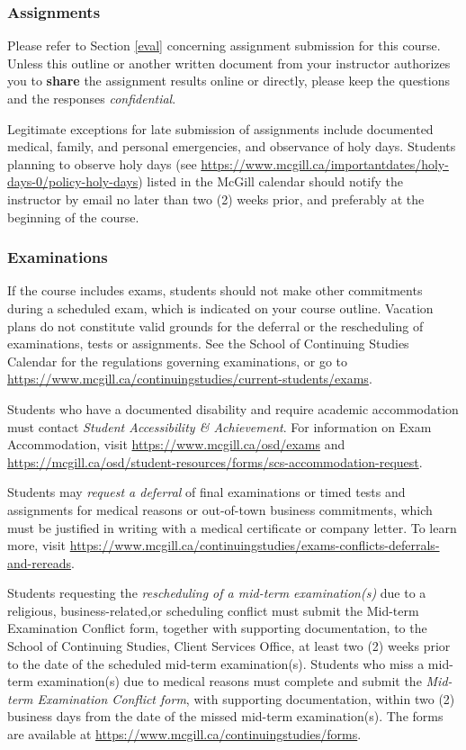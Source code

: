 \documentclass{article}
\begin{document}
\subsubsection{Assignments}

Please refer to Section \ref{eval} concerning assignment submission
for this course. Unless this outline or another written document from
your instructor authorizes you to {\bf share} the assignment results
online or directly, please keep the questions and the responses {\em
  confidential}.

Legitimate exceptions for late submission of assignments include
documented medical, family, and personal emergencies, and observance
of holy days. Students planning to observe holy days (see
\url{https://www.mcgill.ca/importantdates/holy-days-0/policy-holy-days})
listed in the McGill calendar should notify the instructor by email no
later than two (2) weeks prior, and preferably at the beginning of the
course.

\subsubsection{Examinations}

If the course includes exams, students should not make other
commitments during a scheduled exam, which is indicated on your course
outline. Vacation plans do not constitute valid grounds for the
deferral or the rescheduling of examinations, tests or
assignments. See the School of Continuing Studies Calendar for the
regulations governing examinations, or go to
\url{https://www.mcgill.ca/continuingstudies/current-students/exams}.

Students who have a documented disability and require academic
accommodation must contact {\em Student Accessibility \&
  Achievement}. For information on Exam Accommodation, visit
\url{https://www.mcgill.ca/osd/exams} and
\url{https://mcgill.ca/osd/student-resources/forms/scs-accommodation-request}.


Students may {\em request a deferral} of final examinations or timed
tests and assignments for medical reasons or out-of-town business
commitments, which must be justified in writing with a medical
certificate or company letter. To learn more, visit
\url{https://www.mcgill.ca/continuingstudies/exams-conflicts-deferrals-and-rereads}.


Students requesting the {\em rescheduling of a mid-term
  examination(s)} due to a religious, business-related,or scheduling
conflict must submit the Mid-term Examination Conflict form, together
with supporting documentation, to the School of Continuing Studies,
Client Services Office, at least two (2) weeks prior to the date of
the scheduled mid-term examination(s). Students who miss a mid-term
examination(s) due to medical reasons must complete and submit the
{\em Mid-term Examination Conflict form}, with supporting documentation,
within two (2) business days from the date of the missed
mid-term examination(s). The forms are available at
\url{https://www.mcgill.ca/continuingstudies/forms}.
\end{document}
